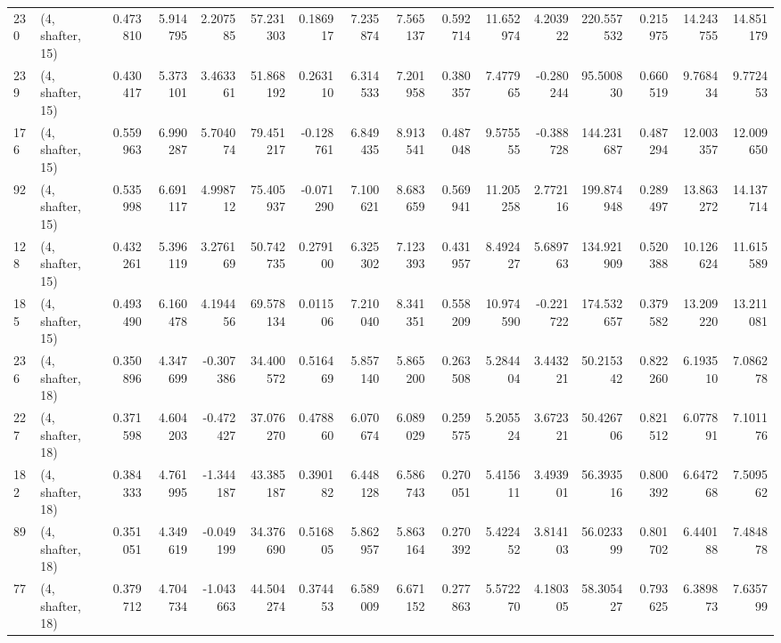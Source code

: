 \begin{tabular}{llrrrrrrrrrrrrrr}
230 &  (4, shafter, 15) &   0.473810 &   5.914795 &  2.207585 &   57.231303 &  0.186917 &   7.235874 &   7.565137 &  0.592714 &  11.652974 &   4.203922 &  220.557532 &  0.215975 &  14.243755 &  14.851179 \\
239 &  (4, shafter, 15) &   0.430417 &   5.373101 &  3.463361 &   51.868192 &  0.263110 &   6.314533 &   7.201958 &  0.380357 &   7.477965 &  -0.280244 &   95.500830 &  0.660519 &   9.768434 &   9.772453 \\
176 &  (4, shafter, 15) &   0.559963 &   6.990287 &  5.704074 &   79.451217 & -0.128761 &   6.849435 &   8.913541 &  0.487048 &   9.575555 &  -0.388728 &  144.231687 &  0.487294 &  12.003357 &  12.009650 \\
92  &  (4, shafter, 15) &   0.535998 &   6.691117 &  4.998712 &   75.405937 & -0.071290 &   7.100621 &   8.683659 &  0.569941 &  11.205258 &   2.772116 &  199.874948 &  0.289497 &  13.863272 &  14.137714 \\
128 &  (4, shafter, 15) &   0.432261 &   5.396119 &  3.276169 &   50.742735 &  0.279100 &   6.325302 &   7.123393 &  0.431957 &   8.492427 &   5.689763 &  134.921909 &  0.520388 &  10.126624 &  11.615589 \\
185 &  (4, shafter, 15) &   0.493490 &   6.160478 &  4.194456 &   69.578134 &  0.011506 &   7.210040 &   8.341351 &  0.558209 &  10.974590 &  -0.221722 &  174.532657 &  0.379582 &  13.209220 &  13.211081 \\
236 &  (4, shafter, 18) &   0.350896 &   4.347699 & -0.307386 &   34.400572 &  0.516469 &   5.857140 &   5.865200 &  0.263508 &   5.284404 &   3.443221 &   50.215342 &  0.822260 &   6.193510 &   7.086278 \\
227 &  (4, shafter, 18) &   0.371598 &   4.604203 & -0.472427 &   37.076270 &  0.478860 &   6.070674 &   6.089029 &  0.259575 &   5.205524 &   3.672321 &   50.426706 &  0.821512 &   6.077891 &   7.101176 \\
182 &  (4, shafter, 18) &   0.384333 &   4.761995 & -1.344187 &   43.385187 &  0.390182 &   6.448128 &   6.586743 &  0.270051 &   5.415611 &   3.493901 &   56.393516 &  0.800392 &   6.647268 &   7.509562 \\
89  &  (4, shafter, 18) &   0.351051 &   4.349619 & -0.049199 &   34.376690 &  0.516805 &   5.862957 &   5.863164 &  0.270392 &   5.422452 &   3.814103 &   56.023399 &  0.801702 &   6.440188 &   7.484878 \\
77  &  (4, shafter, 18) &   0.379712 &   4.704734 & -1.043663 &   44.504274 &  0.374453 &   6.589009 &   6.671152 &  0.277863 &   5.572270 &   4.180305 &   58.305427 &  0.793625 &   6.389873 &   7.635799 \\

\end{tabular}
